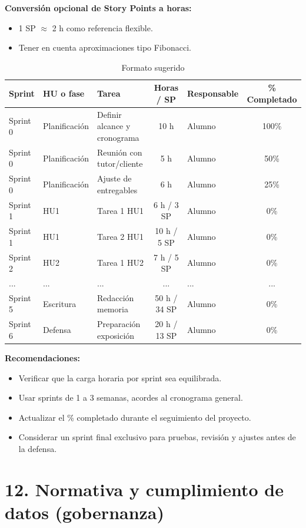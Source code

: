 \documentclass[
11pt, %
]{charter}
\begin{document}
\textbf{Conversión opcional de Story Points a horas:}
\begin{itemize}
  \item 1 SP \(\approx\) 2 h como referencia flexible.
  \item Tener en cuenta aproximaciones tipo Fibonacci.
\end{itemize}

\begin{table}[htpb]
\centering
\caption{Formato sugerido}
\begin{tabularx}{\linewidth}{@{}|l|l|X|c|l|c|@{}}
\hline
\rowcolor[HTML]{C0C0C0}
Sprint & HU o fase & Tarea & Horas / SP & Responsable & \% Completado \\ \hline
Sprint 0 & Planificación & Definir alcance y cronograma & 10 h & Alumno & 100\% \\ \hline
Sprint 0 & Planificación & Reunión con tutor/cliente & 5 h & Alumno & 50\% \\ \hline
Sprint 0 & Planificación & Ajuste de entregables & 6 h & Alumno & 25\% \\ \hline
Sprint 1 & HU1 & Tarea 1 HU1 & 6 h / 3 SP & Alumno & 0\% \\ \hline
Sprint 1 & HU1 & Tarea 2 HU1 & 10 h / 5 SP & Alumno & 0\% \\ \hline
Sprint 2 & HU2 & Tarea 1 HU2 & 7 h / 5 SP & Alumno & 0\% \\ \hline
... & ... & ... & ... & ... & ... \\ \hline
Sprint 5 & Escritura & Redacción memoria & 50 h / 34 SP & Alumno & 0\% \\ \hline
Sprint 6 & Defensa & Preparación exposición & 20 h / 13 SP & Alumno & 0\% \\ \hline
\end{tabularx}
\end{table}

\textbf{Recomendaciones:}
\begin{itemize}
  \item Verificar que la carga horaria por sprint sea equilibrada.
  \item Usar sprints de 1 a 3 semanas, acordes al cronograma general.
  \item Actualizar el \% completado durante el seguimiento del proyecto.
  \item Considerar un sprint final exclusivo para pruebas, revisión y ajustes antes de la defensa.
\end{itemize}


\section{12. Normativa y cumplimiento de datos (gobernanza)}
\end{document}

